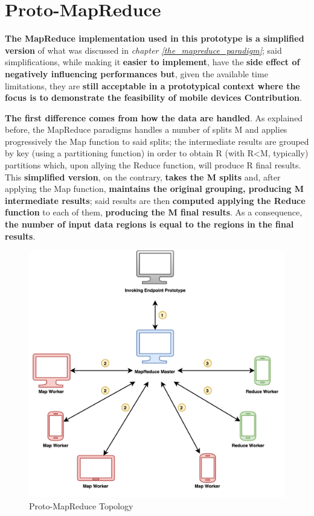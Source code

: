\section{Proto-MapReduce}
\textbf{The MapReduce implementation used in this prototype is a simplified version} of what was discussed in \textit{chapter \ref{the_mapreduce_paradigm}}; said simplifications, while making it \textbf{easier to implement}, have the \textbf{side effect of negatively influencing performances but}, given the available time limitations, they are \textbf{still acceptable in a prototypical context where the focus is to demonstrate the feasibility of mobile devices Contribution}.

\textbf{The first difference comes from how the data are handled}. As explained before, the MapReduce paradigms handles a number of splits M and applies progressively the Map function to said splits; the intermediate results are grouped by key (using a partitioning function) in order to obtain R (with R<M, typically) partitions which, upon allying the Reduce function, will produce R final results. This \textbf{simplified version}, on the contrary, \textbf{takes the M splits} and, after applying the Map function, \textbf{maintains the original grouping, producing M intermediate results}; said results are then \textbf{computed applying the Reduce function} to each of them, \textbf{producing the M final results}. As a consequence, \textbf{the number of input data regions is equal to the regions in the final results}.

\vspace{10mm}

\begin{figure}[!ht]
    \centering
    \includegraphics[scale=1.18]{document/chapters/chapter_6/images/proto_mapreduce.png}
    \caption{Proto-MapReduce Topology}
    \label{fig:proto_mapreduce}
\end{figure}

